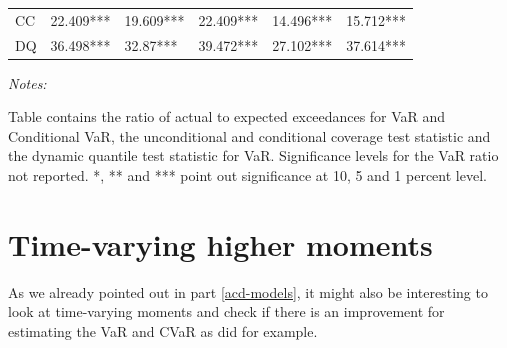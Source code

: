 \documentclass[a4paper, nobind]{templates/ociamthesis}
\begin{document}
\begin{table}
\begin{threeparttable}
\begin{tabular}[t]{llllll}
\hspace{1em}\hspace{1em}CC & 22.409*** & 19.609*** & 22.409*** & 14.496*** & 15.712***\\
\hspace{1em}\hspace{1em}DQ & 36.498*** & 32.87*** & 39.472*** & 27.102*** & 37.614***\\
\bottomrule
\end{tabular}
\begin{tablenotes}
\item \textit{Notes:} 
\item Table contains the ratio of actual to expected exceedances for VaR and Conditional VaR, the unconditional and conditional coverage test statistic and the dynamic quantile test statistic for VaR. Significance levels for the VaR ratio not reported. *, ** and *** point out significance at 10, 5 and 1 percent level.
\end{tablenotes}
\end{threeparttable}
\end{table}

\clearpage

\hypertarget{time-varying-higher-moments}{%
\section{Time-varying higher moments}\label{time-varying-higher-moments}}

As we already pointed out in part \ref{acd-models}, it might also be interesting to look at time-varying moments and check if there is an improvement for estimating the VaR and CVaR as \textcite{bali2008} did for example.
\end{document}
